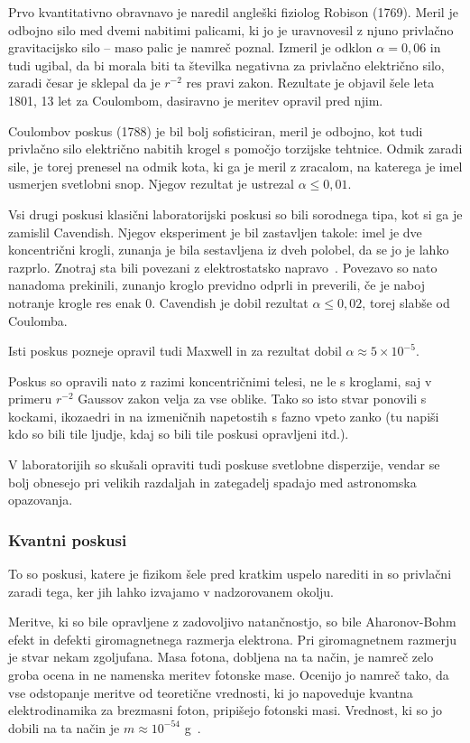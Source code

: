 \documentclass[a4paper, twocolumn, titlepage]{article}
\begin{document}
Prvo kvantitativno obravnavo je naredil angleški fiziolog Robison (1769). Meril je odbojno silo med dvemi nabitimi palicami, ki jo
je uravnovesil z njuno privlačno gravitacijsko silo -- maso palic je namreč poznal. Izmeril je odklon $\alpha = 0,06$ in tudi
ugibal, da bi morala biti ta številka negativna za privlačno električno silo, zaradi česar je sklepal da je $r^{-2}$ res pravi
zakon. Rezultate je objavil šele leta 1801, 13 let za Coulombom, dasiravno je meritev opravil pred njim.

Coulombov poskus (1788) je bil bolj sofisticiran, meril je odbojno, kot tudi privlačno silo električno nabitih krogel s pomočjo
torzijske tehtnice. Odmik zaradi sile, je torej prenesel na odmik kota, ki ga je meril z zracalom, na katerega je imel usmerjen
svetlobni snop. Njegov rezultat je ustrezal $\alpha \leq 0,01$.

Vsi drugi poskusi klasični laboratorijski poskusi so bili sorodnega tipa, kot si ga je zamislil Cavendish. Njegov eksperiment je
bil zastavljen takole: imel je dve koncentrični krogli, zunanja je bila sestavljena iz dveh polobel, da se jo je lahko razprlo.
Znotraj sta bili povezani z elektrostatsko napravo~\cite{over}. Povezavo so nato nanadoma prekinili, zunanjo kroglo previdno odprli
in preverili, če je naboj notranje krogle res enak 0. Cavendish je dobil rezultat $\alpha \leq 0,02$, torej slabše od Coulomba.

Isti poskus pozneje opravil tudi Maxwell in za rezultat dobil $\alpha \approx 5 \times 10^{-5}$.

Poskus so opravili nato z razimi koncentričnimi telesi, ne le s kroglami, saj v primeru $r^{-2}$ Gaussov zakon velja za vse oblike.
Tako so isto stvar ponovili s kockami, ikozaedri in na izmeničnih napetostih s fazno vpeto zanko (tu napiši kdo so bili tile
ljudje, kdaj so bili tile poskusi opravljeni itd.).

V laboratorijih so skušali opraviti tudi poskuse svetlobne disperzije, vendar se bolj obnesejo pri velikih razdaljah in zategadelj spadajo
med astronomska opazovanja.

\subsubsection{Kvantni poskusi}

To so poskusi, katere je fizikom šele pred kratkim uspelo narediti in so privlačni zaradi tega, ker jih lahko izvajamo v nadzorovanem okolju.

Meritve, ki so bile opravljene z zadovoljivo natančnostjo, so bile Aharonov-Bohm efekt in defekti giromagnetnega razmerja elektrona.
Pri giromagnetnem razmerju je stvar nekam zgoljufana. Masa fotona, dobljena na ta način, je namreč zelo groba ocena in ne namenska meritev
fotonske mase. Ocenijo jo namreč tako, da vse odstopanje meritve od teoretične vrednosti, ki jo napoveduje kvantna elektrodinamika za
brezmasni foton, pripišejo fotonski masi. Vrednost, ki so jo dobili na ta način je $m \approx 10^{-54}$ g~\cite{over}.
\end{document}
